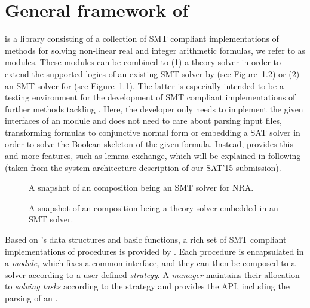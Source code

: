 \chapter{General framework of \smtrat}
\label{chapter:generalframework}
\smtrat is a \Cpp library consisting of a collection of
SMT compliant implementations of methods for solving non-linear real
and integer arithmetic \supportedLogics formulas, we refer to as modules. These modules can be 
combined to (1) a theory solver in order to extend the supported logics of an
existing SMT solver by \supportedLogics (see Figure~\ref{fig:frameworkb}) or (2) an SMT 
solver for \supportedLogics (see Figure~\ref{fig:frameworka}). The latter is 
especially intended to be a testing environment for the development 
of SMT compliant implementations of further methods tackling \supportedLogics. Here,
the developer only needs to implement the given interfaces of an \smtrat 
module and does not need to care about parsing input files, transforming
formulas to conjunctive normal form or embedding a SAT solver in order
to solve the Boolean skeleton of the given formula. Instead, \smtrat
provides this and more features, such as lemma exchange, which will be explained in following (taken from the system architecture description of our SAT'15 submission).

\begin{figure}[ht]
\caption{A snapshot of an \smtrat composition being an SMT solver for NRA.}
\begin{center}

\end{center}
\label{fig:frameworka}
\end{figure}

\begin{figure}[ht]
\caption{A snapshot of an \smtrat composition being a theory solver embedded in an SMT solver.}
\begin{center}

\end{center}
\label{fig:frameworkb}
\end{figure}

Based on \carl's data structures and basic functions, a rich set of SMT compliant implementations of \supportedLogics procedures is provided by \smtrat. Each procedure is encapsulated in a \emph{module}, which fixes a common interface, and they can then be composed to a solver according to a user defined \emph{strategy}. A \emph{manager} maintains their allocation to \emph{solving tasks} according to the strategy and provides the API, including the parsing of an \smtlibfile.

